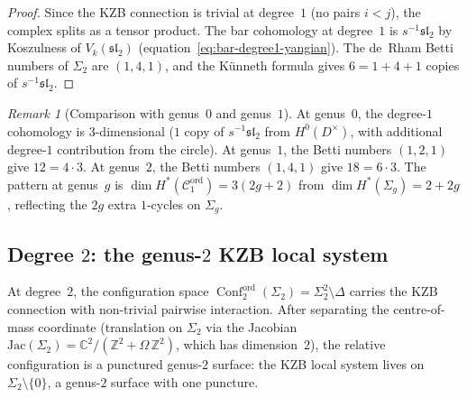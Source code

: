 \documentclass[11pt,reqno]{amsart}
\theoremstyle{definition}
\theoremstyle{remark}
\newtheorem{remark}[theorem]{Remark}
\newcommand{\cC}{\mathcal{C}}
\DeclareMathOperator{\Conf}{Conf}
\newcommand{\CC}{\mathbb{C}}
\newcommand{\ZZ}{\mathbb{Z}}
\numberwithin{equation}{section}
\begin{document}
\begin{proof}
Since the KZB connection is trivial at degree~$1$
(no pairs $i < j$), the complex splits as a tensor
product. The bar cohomology at degree~$1$ is
$s^{-1}\mathfrak{sl}_2$ by
Koszulness of $V_k(\mathfrak{sl}_2)$
(equation~\eqref{eq:bar-degree1-yangian}). The de~Rham
Betti numbers of $\Sigma_2$ are $(1, 4, 1)$, and
the K\"unneth formula gives $6 = 1 + 4 + 1$ copies of
$s^{-1}\mathfrak{sl}_2$.
\end{proof}

\begin{remark}[Comparison with genus~$0$ and genus~$1$]
At genus~$0$, the degree-$1$ cohomology is
$3$-dimensional ($1$ copy of $s^{-1}\mathfrak{sl}_2$
from $H^0(D^\times)$, with additional degree-$1$
contribution from the circle). At genus~$1$, the Betti
numbers $(1,2,1)$ give $12 = 4 \cdot 3$. At genus~$2$,
the Betti numbers $(1,4,1)$ give $18 = 6 \cdot 3$. The
pattern at genus~$g$ is
$\dim H^*(\cC_1^{\mathrm{ord}}) = 3(2g + 2)$ from
$\dim H^*(\Sigma_g) = 2 + 2g$, reflecting the $2g$
extra $1$-cycles on $\Sigma_g$.
\end{remark}

\subsection{Degree $2$: the genus-$2$ KZB local system}
\label{subsec:g2-degree2}

At degree~$2$, the configuration space
$\Conf_2^{\mathrm{ord}}(\Sigma_2) = \Sigma_2^2 \setminus
\Delta$ carries the KZB connection with non-trivial
pairwise interaction. After separating the
centre-of-mass coordinate (translation on $\Sigma_2$ via
the Jacobian $\mathrm{Jac}(\Sigma_2) =
\CC^2/(\ZZ^2 + \Omega\,\ZZ^2)$, which has dimension~$2$),
the relative configuration is a punctured
genus-$2$ surface:
the KZB local system lives on $\Sigma_2 \setminus \{0\}$,
a genus-$2$ surface with one puncture.
\end{document}
